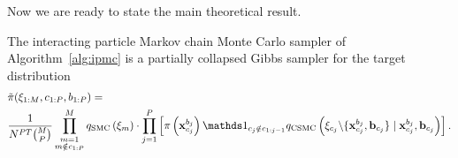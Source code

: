 Now we are ready to state the main theoretical result.
\begin{theorem}
	\label{thm:one}
	The interacting particle Markov chain Monte Carlo sampler of Algorithm~\ref{alg:ipmc} is a partially collapsed Gibbs sampler \citep{van2008partially} for the target distribution
	\begin{align}
	\label{eq:targetdistribution}
	&\tilde \pi(\xib_{1:M}, c_{1:P}, b_{1:P}) =  \nonumber \\
	&\frac{1}{N^{PT} \binom{M}{P}} \prod_{\substack{m=1\\m\notin c_{1:P}}}^M q_{\text{SMC}}\left(\xib_m\right) \cdot \prod_{j = 1}^P \left[ \pi\left(\xb_{c_j}^{b_j}\right) \iden_{c_j \notin c_{1:j-1}} 
	q_{\text{CSMC}}\left(\xib_{c_j} \backslash \{\xb_{c_j}^{b_j}, \bb_{c_j}\} \mid \xb_{c_j}^{b_j}, \bb_{c_j}\right) \right].
	\end{align}
\end{theorem}
